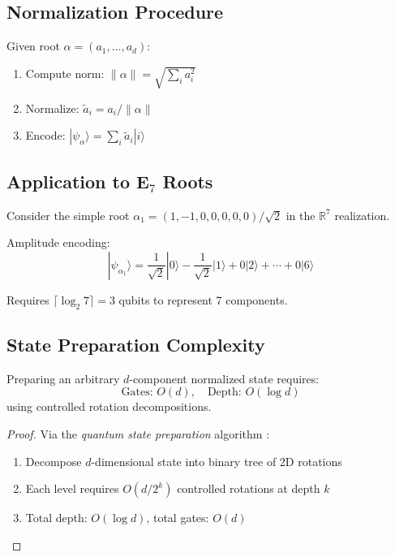\subsection{Normalization Procedure}

Given root $\alpha = (a_1, \ldots, a_d)$:
\begin{enumerate}
    \item Compute norm: $\|\alpha\| = \sqrt{\sum_i a_i^2}$
    \item Normalize: $\tilde{a}_i = a_i / \|\alpha\|$
    \item Encode: $|\psi_\alpha\rangle = \sum_i \tilde{a}_i |i\rangle$
\end{enumerate}

\subsection{Application to E$_7$ Roots}

\begin{example}
\label{ex:e7_amplitude}
Consider the simple root $\alpha_1 = (1, -1, 0, 0, 0, 0, 0)/\sqrt{2}$ in the $\mathbb{R}^7$ realization.

Amplitude encoding:
\begin{equation}
|\psi_{\alpha_1}\rangle = \frac{1}{\sqrt{2}}|0\rangle - \frac{1}{\sqrt{2}}|1\rangle + 0|2\rangle + \cdots + 0|6\rangle
\end{equation}

Requires $\lceil \log_2 7 \rceil = 3$ qubits to represent 7 components.
\end{example}

\subsection{State Preparation Complexity}

\begin{theorem}
\label{thm:amplitude_circuit_depth}
Preparing an arbitrary $d$-component normalized state requires:
\begin{equation}
\text{Gates: } O(d), \quad \text{Depth: } O(\log d)
\end{equation}
using controlled rotation decompositions.
\end{theorem}

\begin{proof}
Via the \textit{quantum state preparation} algorithm \cite{shende2006synthesis}:
\begin{enumerate}
    \item Decompose $d$-dimensional state into binary tree of 2D rotations
    \item Each level requires $O(d/2^k)$ controlled rotations at depth $k$
    \item Total depth: $O(\log d)$, total gates: $O(d)$
\end{enumerate}
\end{proof}

